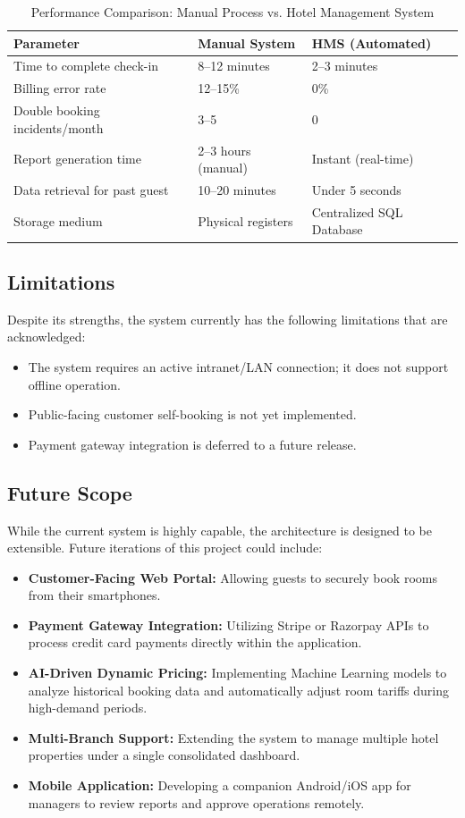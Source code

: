 \documentclass[12pt,a4paper]{article}
\begin{document}
\begin{table}[H]
\centering
\renewcommand{\arraystretch}{1.5}
\begin{tabularx}{\textwidth}{|X|l|l|}
\hline
\textbf{Parameter} & \textbf{Manual System} & \textbf{HMS (Automated)} \\
\hline
Time to complete check-in & 8--12 minutes & 2--3 minutes \\
\hline
Billing error rate & 12--15\% & 0\% \\
\hline
Double booking incidents/month & 3--5 & 0 \\
\hline
Report generation time & 2--3 hours (manual) & Instant (real-time) \\
\hline
Data retrieval for past guest & 10--20 minutes & Under 5 seconds \\
\hline
Storage medium & Physical registers & Centralized SQL Database \\
\hline
\end{tabularx}
\caption{Performance Comparison: Manual Process vs. Hotel Management System}
\end{table}

\subsection{Limitations}
Despite its strengths, the system currently has the following limitations that are acknowledged:
\begin{itemize}
    \item The system requires an active intranet/LAN connection; it does not support offline operation.
    \item Public-facing customer self-booking is not yet implemented.
    \item Payment gateway integration is deferred to a future release.
\end{itemize}

\subsection{Future Scope}
While the current system is highly capable, the architecture is designed to be extensible. Future iterations of this project could include:
\begin{itemize}
    \item \textbf{Customer-Facing Web Portal:} Allowing guests to securely book rooms from their smartphones.
    \item \textbf{Payment Gateway Integration:} Utilizing Stripe or Razorpay APIs to process credit card payments directly within the application.
    \item \textbf{AI-Driven Dynamic Pricing:} Implementing Machine Learning models to analyze historical booking data and automatically adjust room tariffs during high-demand periods.
    \item \textbf{Multi-Branch Support:} Extending the system to manage multiple hotel properties under a single consolidated dashboard.
    \item \textbf{Mobile Application:} Developing a companion Android/iOS app for managers to review reports and approve operations remotely.
\end{itemize}
\end{document}

